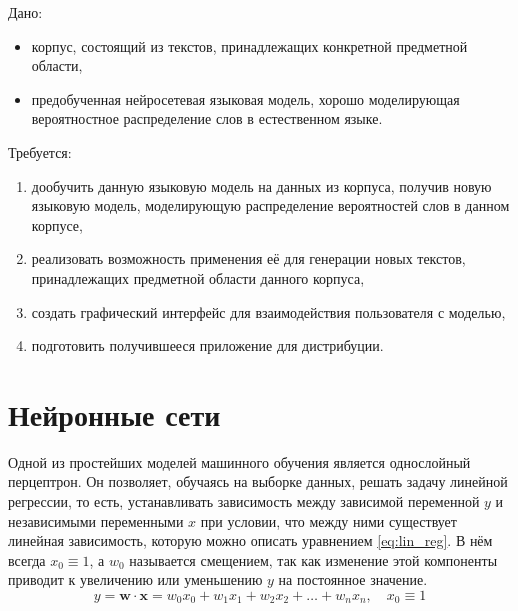Дано:
\begin{itemize}
    \item корпус, состоящий из текстов, принадлежащих конкретной предметной области,
    \item предобученная нейросетевая языковая модель, хорошо моделирующая вероятностное распределение слов в естественном языке.
\end{itemize}
Требуется:
\begin{enumerate}
    \item дообучить данную языковую модель на данных из корпуса, получив новую языковую модель, моделирующую распределение вероятностей слов в данном корпусе,
    \item реализовать возможность применения её для генерации новых текстов, принадлежащих предметной области данного корпуса,
    \item создать графический интерфейс для взаимодействия пользователя с моделью,
    \item подготовить получившееся приложение для дистрибуции.
\end{enumerate}

\section{Нейронные сети}

Одной из простейших моделей машинного обучения является однослойный перцептрон. Он позволяет, обучаясь на выборке данных, решать задачу линейной регрессии, то есть, устанавливать зависимость между зависимой переменной $y$ и независимыми переменными $x$ при условии, что между ними существует линейная зависимость, которую можно описать уравнением \ref*{eq:lin_reg}. В нём всегда $x_0\equiv 1$, а $w_0$ называется смещением, так как изменение этой компоненты приводит к увеличению или уменьшению $y$ на постоянное значение.
\begin{equation}
    \label{eq:lin_reg}
    y=\mathbf{w}\cdot\mathbf{x}=w_0x_0+w_1x_1+w_2x_2+\dots+w_nx_n,\quad x_0\equiv 1
\end{equation}

